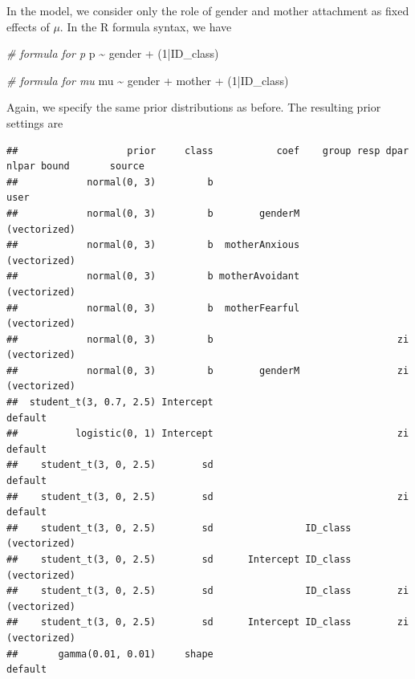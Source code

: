 \documentclass[
]{book}
\newenvironment{Shaded}{\begin{snugshade}}{\end{snugshade}}
\newcommand{\CommentTok}[1]{\textcolor[rgb]{0.56,0.35,0.01}{\textit{#1}}}
\newcommand{\DecValTok}[1]{\textcolor[rgb]{0.00,0.00,0.81}{#1}}
\newcommand{\NormalTok}[1]{#1}
\newcommand{\SpecialCharTok}[1]{\textcolor[rgb]{0.00,0.00,0.00}{#1}}
\begin{document}
In the model, we consider only the role of gender and mother attachment as fixed effects of \(\mu\). In the R formula syntax, we have

\begin{Shaded}
\begin{Highlighting}[]
\CommentTok{\# formula for p}
\NormalTok{p }\SpecialCharTok{\textasciitilde{}}\NormalTok{ gender }\SpecialCharTok{+}\NormalTok{ (}\DecValTok{1}\SpecialCharTok{|}\NormalTok{ID\_class)}

\CommentTok{\# formula for mu}
\NormalTok{mu }\SpecialCharTok{\textasciitilde{}}\NormalTok{ gender }\SpecialCharTok{+}\NormalTok{ mother }\SpecialCharTok{+}\NormalTok{ (}\DecValTok{1}\SpecialCharTok{|}\NormalTok{ID\_class)}
\end{Highlighting}
\end{Shaded}

Again, we specify the same prior distributions as before. The resulting prior settings are

\begin{verbatim}
##                   prior     class           coef    group resp dpar nlpar bound       source
##            normal(0, 3)         b                                                       user
##            normal(0, 3)         b        genderM                                (vectorized)
##            normal(0, 3)         b  motherAnxious                                (vectorized)
##            normal(0, 3)         b motherAvoidant                                (vectorized)
##            normal(0, 3)         b  motherFearful                                (vectorized)
##            normal(0, 3)         b                                zi             (vectorized)
##            normal(0, 3)         b        genderM                 zi             (vectorized)
##  student_t(3, 0.7, 2.5) Intercept                                                    default
##          logistic(0, 1) Intercept                                zi                  default
##    student_t(3, 0, 2.5)        sd                                                    default
##    student_t(3, 0, 2.5)        sd                                zi                  default
##    student_t(3, 0, 2.5)        sd                ID_class                       (vectorized)
##    student_t(3, 0, 2.5)        sd      Intercept ID_class                       (vectorized)
##    student_t(3, 0, 2.5)        sd                ID_class        zi             (vectorized)
##    student_t(3, 0, 2.5)        sd      Intercept ID_class        zi             (vectorized)
##       gamma(0.01, 0.01)     shape                                                    default
\end{verbatim}
\end{document}
